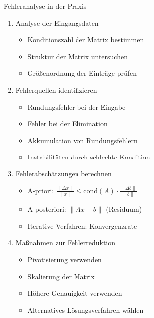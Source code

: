 \begin{KR}{Fehleranalyse in der Praxis}
\begin{enumerate}
    \item Analyse der Eingangsdaten
    \begin{itemize}
        \item Konditionszahl der Matrix bestimmen
        \item Struktur der Matrix untersuchen
        \item Größenordnung der Einträge prüfen
    \end{itemize}
    
    \item Fehlerquellen identifizieren
    \begin{itemize}
        \item Rundungsfehler bei der Eingabe
        \item Fehler bei der Elimination
        \item Akkumulation von Rundungsfehlern
        \item Instabilitäten durch schlechte Kondition
    \end{itemize}
    
    \item Fehlerabschätzungen berechnen
    \begin{itemize}
        \item A-priori: $\frac{\|\Delta x\|}{\|x\|} \leq \text{cond}(A) \cdot \frac{\|\Delta b\|}{\|b\|}$
        \item A-posteriori: $\|Ax-b\|$ (Residuum)
        \item Iterative Verfahren: Konvergenzrate
    \end{itemize}
    
    \item Maßnahmen zur Fehlerreduktion
    \begin{itemize}
        \item Pivotisierung verwenden
        \item Skalierung der Matrix
        \item Höhere Genauigkeit verwenden
        \item Alternatives Lösungsverfahren wählen
    \end{itemize}
\end{enumerate}
\end{KR}

